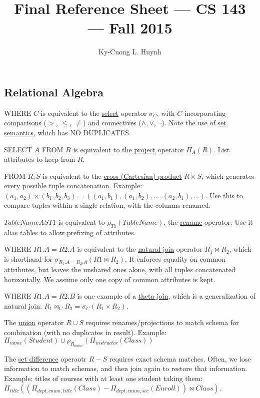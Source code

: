 \documentclass[10pt,letterpaper,twocolumn]{article}
\title{Final Reference Sheet --- CS 143 
        --- Fall 2015}
\author{Ky-Cuong L. Huynh}
\begin{document}
 

\maketitle
\frenchspacing

\subsection{Relational Algebra} 

WHERE $ C $ is equivalent to the \underline{select} operator
$ \sigma_C $, with $ C $ incorporating comparisons
($ > $, $ \le $, $ \neq $) and connectives ($ \land, \lor, \lnot $).
Note the use of \underline{set semantics}, which has NO DUPLICATES.

SELECT $ A $ FROM $ R $ is equivalent to the \underline{project}
operator $ \Pi_A(R) $. List attributes to keep from $ R $. 

FROM $ R, S $ is equivalent to the \underline{cross (Cartesian) product} 
$ R \times S $, which generates every possible tuple concatenation.
Example: $ (a_1, a_2) \times (b_1, b_2, b_3) = ((a_1, b_1), (a_1, b_2), 
\dots, (a_2, b_1), \dots) $. Use this to compare tuples within a single
relation, with the columns renamed. 

$ TableName AS T1 $ is equivalent to $ \rho_{T1}(TableName) $, the 
\underline{rename} operator. Use it alias tables to allow prefixing of attributes.

WHERE $ R1.A = R2.A $ is equivalent to the \underline{natural join} 
operator
$ R_1 \bowtie R_2 $, which is shorthand for $ \sigma_{R_1.A=R_2.A}
(R1 \bowtie R_2) $. It enforces equality on common attributes, 
but leaves the unshared ones alone, with all tuples concatenated
horizontally. We assume only one copy of common attributes is kept.

WHERE $ R1.A = R2.B $ is one example of a \underline{theta join}, 
which is a generalization of natural join: $ R_1 \bowtie_C R_2 = 
\sigma_C(R_1 \times R_2) $.

The \underline{union} operator $ R \cup S $ requires renames/projections 
to match schema for combination (with no duplicates in result). 
Example: $ \Pi_{name}(Student) \cup \rho_{R_{name}}(\Pi_{instructor}(Class)) $

The \underline{set difference} operaotr $ R - S $ requires exact schema 
matches. Often, we lose information to match schemas, and then join
again to restore that information. Example: titles of courses with 
at least one student taking them:
$ \Pi_{title}((\Pi_{dept,cnum,title}(Class) - \Pi_{dept,cnum,sec}(Enroll)) \bowtie Class) $. 
\end{document}
